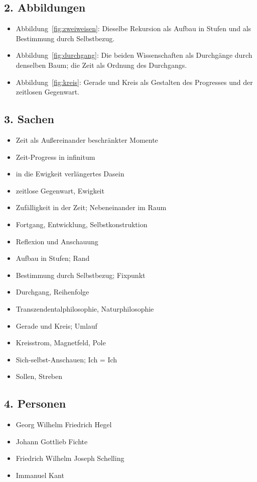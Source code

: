 \documentclass[11pt,a4paper]{article}
\begin{document}
\subsection*{2. Abbildungen}
\begin{itemize}
\item Abbildung~\ref{fig:zweiweisen}: Dieselbe Rekursion als Aufbau in Stufen und als Bestimmung durch Selbstbezug.
\item Abbildung~\ref{fig:durchgang}: Die beiden Wissenschaften als Durchgänge durch denselben Baum; die Zeit als Ordnung des Durchgangs.
\item Abbildung~\ref{fig:kreis}: Gerade und Kreis als Gestalten des Progresses und der zeitlosen Gegenwart.
\end{itemize}

\subsection*{3. Sachen}
\begin{itemize}
\item Zeit als Außereinander beschränkter Momente
\item Zeit-Progress in infinitum
\item in die Ewigkeit verlängertes Dasein
\item zeitlose Gegenwart, Ewigkeit
\item Zufälligkeit in der Zeit; Nebeneinander im Raum
\item Fortgang, Entwicklung, Selbstkonstruktion
\item Reflexion und Anschauung
\item Aufbau in Stufen; Rand
\item Bestimmung durch Selbstbezug; Fixpunkt
\item Durchgang, Reihenfolge
\item Transzendentalphilosophie, Naturphilosophie
\item Gerade und Kreis; Umlauf
\item Kreisstrom, Magnetfeld, Pole
\item Sich-selbst-Anschauen; Ich = Ich
\item Sollen, Streben
\end{itemize}

\subsection*{4. Personen}
\begin{itemize}
\item Georg Wilhelm Friedrich Hegel
\item Johann Gottlieb Fichte
\item Friedrich Wilhelm Joseph Schelling
\item Immanuel Kant
\end{itemize}
\end{document}
